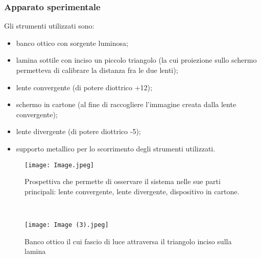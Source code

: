 \documentclass{article}
\begin{document}
\subsubsection{Apparato sperimentale} %
Gli strumenti utilizzati sono:
\begin{itemize}
    \item banco ottico con sorgente luminosa;
    \item lamina sottile con inciso un piccolo triangolo (la cui proiezione sullo schermo permetteva di calibrare la distanza fra le due lenti);
    \item lente convergente (di potere diottrico +12);
    \item schermo in cartone (al fine di raccogliere l'immagine creata dalla lente convergente);
    \item lente divergente (di potere diottrico -5);
    \item supporto metallico per lo scorrimento degli strumenti utilizzati.
\end{itemize}

\vspace{1em}



\begin{figure} [H]
\begin{minipage}[b]{8.5cm}
\centering
\texttt{[image: Image.jpeg]}
\caption{Prospettiva che permette di osservare il sistema nelle sue parti principali: lente convergente, lente divergente, dispositivo in cartone. }
\end{minipage}
\ \hspace{2mm} \hspace{3mm} \
\begin{minipage}[b]{5.5cm}
\centering
\texttt{[image: Image (3).jpeg]}
\caption{Banco ottico il cui fascio di luce attraversa il triangolo inciso sulla lamina}
\end{minipage}
\end{figure}
\FloatBarrier
\end{document}
